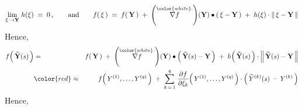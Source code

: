 \begin{equation*}
\underset{\xi\,\rightarrow\mathbf{Y}}{\lim}\;h(\xi)
\; = \;
    0\,,
\quad\quad
\textnormal{and}
\quad\quad
f\!\left(\,\xi\,\right)
\; = \;
    f\!\left(\,\mathbf{Y}\,\right)
    \; + \;
    \left(\overset{{\color{white}.}}{\nabla f}\right)\!(\mathbf{Y})
    \bullet
    \left(\,\xi - \mathbf{Y}\,\right)
    \; + \;
    h(\xi)\cdot\left\Vert\,\xi - \mathbf{Y}\,\right\Vert
\end{equation*}
Hence,
\begin{eqnarray*}
f\!\left(\,\widehat{\mathbf{Y}}(s)\,\right)
& = &
    f\!\left(\,\mathbf{Y}\,\right)
    \; + \;
    \left(\overset{{\color{white}.}}{\nabla f}\right)\!(\mathbf{Y})
    \bullet
    \left(\,\widehat{\mathbf{Y}}(s) - \mathbf{Y}\,\right)
    \; + \;
    h\!\left(\,\widehat{\mathbf{Y}}(s)\,\right)
    \cdot
    \left\Vert\,
        \widehat{\mathbf{Y}}(s) - \mathbf{Y}
        \,\right\Vert
\\
& {\color{red}\approx} &
    f\!\left(\,Y^{(1)},\ldots,Y^{(q)}\,\right)
    \; + \;
    \overset{q}{\underset{k\,=\,1}{\sum}}\;
    \dfrac{\partial f}{\partial \xi_{k}}\!\left(\,
        Y^{(1)},\ldots,Y^{(q)}
        \,\right)
    \cdot
    \left(\,\widehat{Y}^{(k)}(s)\,-\,Y^{(k)}\,\right)
\end{eqnarray*}
Hence,
